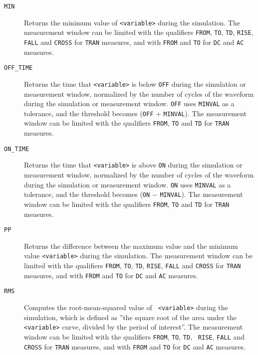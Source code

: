 \begin{Command}
\begin{Arguments}
\begin{description}
  \item[\tt MIN] Returns the minimum value of {\tt <variable>} during
    the simulation.  The measurement window can be limited with the
    qualifiers {\tt FROM}, {\tt TO}, {\tt TD}, {\tt RISE}, {\tt FALL}
    and {\tt CROSS} for {\tt TRAN} measures, and with {\tt FROM} and
    {\tt TO} for {\tt DC} and {\tt AC} measures.

  \item[\tt OFF\_TIME] Returns the time that {\tt <variable>} is below
    {\tt OFF} during the simulation or measurement window, normalized
    by the number of cycles of the waveform during the simulation or
    measurement window.  {\tt OFF} uses {\tt MINVAL} as a tolerance,
    and the threshold becomes ({\tt OFF} $+$ {\tt MINVAL}).  The
    measurement window can be limited with the qualifiers {\tt FROM},
    {\tt TO} and {\tt TD} for {\tt TRAN} measures.

  \item[\tt ON\_TIME] Returns the time that {\tt <variable>} is above
    {\tt ON} during the simulation or measurement window, normalized
    by the number of cycles of the waveform during the simulation or
    measurement window.  {\tt ON} uses {\tt MINVAL} as a tolerance,
    and the threshold becomes ({\tt ON} $-$ {\tt MINVAL}).  The
    measurement window can be limited with the qualifiers {\tt FROM},
    {\tt TO} and {\tt TD} for {\tt TRAN} measures.

  \item[\tt PP] Returns the difference between the maximum value and
    the minimum value {\tt <variable>} during the simulation. The
    measurement window can be limited with the qualifiers {\tt FROM},
    {\tt TO}, {\tt TD}, {\tt RISE}, {\tt FALL} and {\tt CROSS} for
    {\tt TRAN} measures, and with {\tt FROM} and {\tt TO} for {\tt DC}
    and {\tt AC} measures.

  \item[\tt RMS] Computes the root-mean-squared value of {\tt
    <variable>} during the simulation, which is defined as ''the
    square root of the area under the {\tt <variable>} curve, divided by
    the period of interest''.  The measurement window can be
    limited with the qualifiers {\tt FROM}, {\tt TO}, {\tt TD}, {\tt
    RISE}, {\tt FALL} and {\tt CROSS} for {\tt TRAN} measures, and with
    {\tt FROM} and {\tt TO} for {\tt DC} and {\tt AC} measures.


\end{description}
\end{Arguments}
\end{Command}
